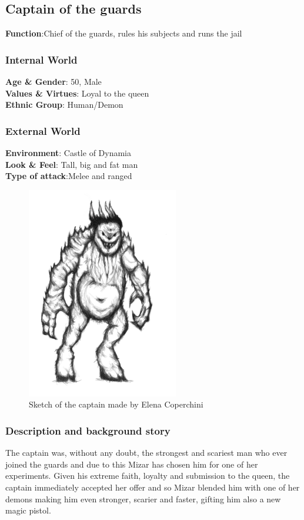 \subsection{Captain of the guards}

\begin{minipage}{0.5\textwidth}
\textbf{Function}:Chief of the guards, rules his subjects and runs the jail

\subsubsection{Internal World}

\textbf{Age \& Gender}: 50, Male \\
\textbf{Values \& Virtues}: Loyal to the queen\\
\textbf{Ethnic Group}: Human/Demon

\subsubsection{External World}
\textbf{Environment}: Castle of Dynamia \\
\textbf{Look \& Feel}: Tall, big and fat man\\
\textbf{Type of attack}:Melee and ranged \\
\end{minipage}%
%
\hfill\begin{minipage}{0.4\textwidth}
  \begin{figure}[H]
  \includegraphics{Images/Enemies/captain_portrait}
   \caption{Sketch of the captain made by Elena Coperchini}
  \end{figure}
\end{minipage}


\subsubsection{Description and background story}
The captain was, without any doubt, the strongest and scariest man who ever joined the guards and due to this Mizar has chosen him for one of her experiments. Given his extreme faith, loyalty and submission to the queen, the captain immediately accepted her offer and so Mizar blended him with one of her demons making him even stronger, scarier and faster, gifting him also a new magic pistol.

